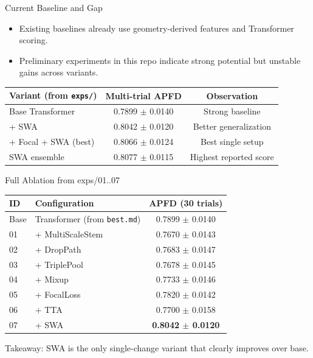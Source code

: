 ﻿\documentclass[10pt,aspectratio=169]{beamer}
\begin{document}
\begin{frame}{Current Baseline and Gap}
\begin{itemize}
  \item Existing baselines already use geometry-derived features and Transformer scoring.
  \item Preliminary experiments in this repo indicate strong potential but unstable gains across variants.
\end{itemize}
\vspace{0.2cm}
\begin{table}
\centering
\small
\begin{tabular}{lcc}
\toprule
Variant (from \texttt{exps/}) & Multi-trial APFD & Observation \\
\midrule
Base Transformer & 0.7899 $\pm$ 0.0140 & Strong baseline \\
+ SWA & 0.8042 $\pm$ 0.0120 & Better generalization \\
+ Focal + SWA (best) & 0.8066 $\pm$ 0.0124 & Best single setup \\
SWA ensemble & 0.8077 $\pm$ 0.0115 & Highest reported score \\
\bottomrule
\end{tabular}
\end{table}
\end{frame}

\begin{frame}{Full Ablation from exps/01..07}
\scriptsize
\begin{table}
\centering
\begin{tabular}{llc}
\toprule
\textbf{ID} & \textbf{Configuration} & \textbf{APFD (30 trials)} \\
\midrule
Base & Transformer (from \texttt{best.md}) & 0.7899 $\pm$ 0.0140 \\
01 & + MultiScaleStem & 0.7670 $\pm$ 0.0143 \\
02 & + DropPath & 0.7683 $\pm$ 0.0147 \\
03 & + TriplePool & 0.7678 $\pm$ 0.0145 \\
04 & + Mixup & 0.7733 $\pm$ 0.0146 \\
05 & + FocalLoss & 0.7820 $\pm$ 0.0142 \\
06 & + TTA & 0.7700 $\pm$ 0.0158 \\
07 & + SWA & \textbf{0.8042 $\pm$ 0.0120} \\
\bottomrule
\end{tabular}
\end{table}
\vspace{0.1cm}
\small
Takeaway: SWA is the only single-change variant that clearly improves over base.
\end{frame}
\end{document}
